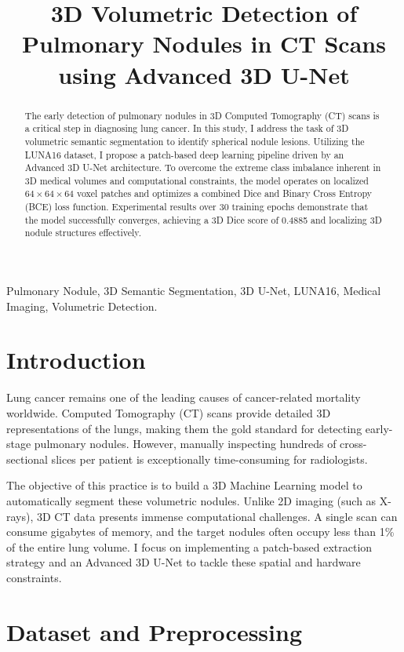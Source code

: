 \documentclass[conference]{IEEEtran}
\title{3D Volumetric Detection of Pulmonary Nodules in CT Scans using Advanced 3D U-Net}
\author{\IEEEauthorblockN{Do Hong Chung}
\IEEEauthorblockA{\textit{Department of Data Science} \\
\textit{University of Science and Technology of Hanoi}\\
Hanoi, Vietnam \\
chungdh.22ba13055@usth.edu.vn}
\IEEEauthorblockA{Student ID: 22BA13055}
}
\begin{document}
\maketitle

\begin{abstract}
The early detection of pulmonary nodules in 3D Computed Tomography (CT) scans is a critical step in diagnosing lung cancer. In this study, I address the task of 3D volumetric semantic segmentation to identify spherical nodule lesions. Utilizing the LUNA16 dataset, I propose a patch-based deep learning pipeline driven by an Advanced 3D U-Net architecture. To overcome the extreme class imbalance inherent in 3D medical volumes and computational constraints, the model operates on localized $64 \times 64 \times 64$ voxel patches and optimizes a combined Dice and Binary Cross Entropy (BCE) loss function. Experimental results over 30 training epochs demonstrate that the model successfully converges, achieving a 3D Dice score of 0.4885 and localizing 3D nodule structures effectively.
\end{abstract}

\begin{IEEEkeywords}
Pulmonary Nodule, 3D Semantic Segmentation, 3D U-Net, LUNA16, Medical Imaging, Volumetric Detection.
\end{IEEEkeywords}

\section{Introduction}
Lung cancer remains one of the leading causes of cancer-related mortality worldwide. Computed Tomography (CT) scans provide detailed 3D representations of the lungs, making them the gold standard for detecting early-stage pulmonary nodules. However, manually inspecting hundreds of cross-sectional slices per patient is exceptionally time-consuming for radiologists.

The objective of this practice is to build a 3D Machine Learning model to automatically segment these volumetric nodules. Unlike 2D imaging (such as X-rays), 3D CT data presents immense computational challenges. A single scan can consume gigabytes of memory, and the target nodules often occupy less than 1\% of the entire lung volume. I focus on implementing a patch-based extraction strategy and an Advanced 3D U-Net to tackle these spatial and hardware constraints.

\section{Dataset and Preprocessing}
\end{document}
